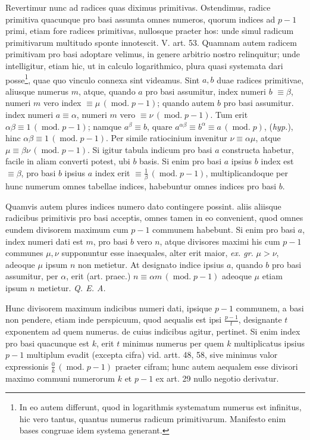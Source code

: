 
Revertimur nunc ad radices quas diximus primitivas. Ostendimus, radice primitiva quacunque pro basi assumta omnes numeros, quorum indices ad $p-1$ primi, etiam fore radices primitivas, nullosque praeter hos: unde simul radicum primitivarum multitudo sponte innotescit. V. art. 53. Quamnam autem radicem primitivam pro basi adoptare velimus, in genere arbitrio nostro relinquitur; unde intelligitur, etiam hic, ut in calculo logarithmico, plura quasi systemata dari posse\begingroup\renewcommand{\thefootnote}{*)}\footnote{In eo autem differunt, quod in logarithmis systematum numerus est infinitus, hic vero tantus, quantus numerus radicum primitivarum. Manifesto enim bases congruae idem systema generant.}\endgroup,
quae quo vinculo connexa sint videamus. Sint $a,b$ duae radices primitivae, aliusque numerus $m$, atque, quando $a$ pro basi assumitur, index numeri $b$ $\equiv\beta$, numeri $m$ vero index $\equiv\mu\,(\operatorname{mod.}p-1)$; quando autem $b$ pro basi assumitur. index numeri $a\equiv\alpha$, numeri $m$ vero $\equiv\nu\,(\operatorname{mod.}p-1)$. Tum erit $\alpha\beta\equiv1\,(\operatorname{mod.}p-1)$; namque $a^\beta\equiv b$, quare $a^{\alpha\beta}\equiv b^\alpha\equiv a\,(\operatorname{mod.}p)$, (\emph{hyp.}), hinc $\alpha\beta\equiv1\,(\operatorname{mod.}p-1)$. Per simile ratiocinium invenitur $\nu\equiv\alpha\mu$, atque $\mu\equiv\beta\nu\,(\operatorname{mod.}p-1)$. Si igitur tabula indicum pro basi $a$ constructa habetur, facile in aliam converti potest, ubi $b$ basis. Si enim pro basi $a$ ipsius $b$ index est $\equiv\beta$, pro basi $b$ ipsius $a$ index erit $\equiv\frac{1}{\beta}\,(\operatorname{mod.}p-1)$, multiplicandoque per hunc numerum omnes tabellae indices, habebuntur omnes indices pro basi $b$.


Quamvis autem plures indices numero dato contingere possint. aliis aliisque radicibus primitivis pro basi acceptis, omnes tamen in eo convenient, quod omnes eundem divisorem maximum cum $p-1$ communem habebunt. Si enim pro basi $a$, index numeri dati est $m$, pro basi $b$ vero $n$, atque divisores maximi his cum $p-1$ communes $\mu,\nu$ supponuntur esse inaequales, alter erit maior, \emph{ex. gr.} $\mu>\nu$, adeoque $\mu$ ipsum $n$ non metietur. At designato indice ipsius $a$, quando $b$ pro basi assumitur, per $\alpha$, erit (art. praec.) $n\equiv\alpha m\,(\operatorname{mod.}p-1)$ adeoque $\mu$ etiam ipsum $n$ metietur. \emph{Q. E. A.}

Hunc divisorem maximum indicibus numeri dati, ipsique $p-1$ communem, a basi non pendere, etiam inde perspicuum, quod aequalis est ipsi $\frac{p-1}{t}$, designante $t$ exponentem ad quem numerus. de cuius indicibus agitur, pertinet. Si enim index pro basi quacunque est $k$, erit $t$ minimus numerus per quem $k$ multiplicatus ipsius $p-1$ multiplum evadit (excepta cifra) vid. artt. 48, 58, sive minimus valor expressionis $\frac{0}{k}\,(\operatorname{mod.}p-1)$ praeter cifram; hunc autem aequalem esse divisori maximo communi numerorum $k$ et $p-1$ ex art. 29 nullo negotio derivatur.

